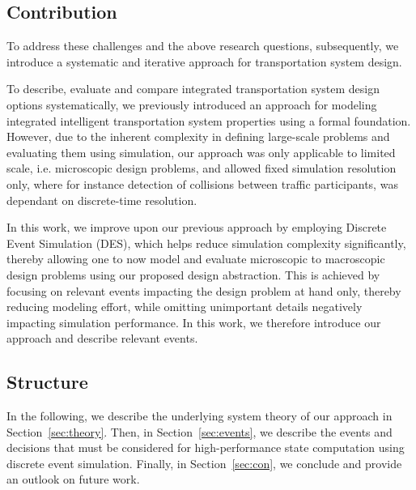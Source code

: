 \documentclass[graybox]{svmult}
\begin{document}
\subsection{Contribution}
To address these challenges and the above research questions, subsequently, we introduce a systematic and iterative approach for transportation system design.

To describe, evaluate and compare integrated transportation system design options systematically, we previously introduced an approach for modeling integrated intelligent transportation system properties using a formal foundation. However, due to the inherent complexity in defining large-scale problems and evaluating them using simulation, our approach was only applicable to limited scale, i.e. microscopic design problems, and allowed fixed simulation resolution only, where for instance detection of collisions between traffic participants, was dependant on discrete-time resolution.  

In this work, we improve upon our previous approach by employing Discrete Event Simulation (DES), which helps reduce simulation complexity significantly, thereby allowing one to now model and evaluate microscopic to macroscopic design problems using our proposed design abstraction. This is achieved by focusing on relevant events impacting the design problem at hand only, thereby reducing modeling effort, while omitting unimportant details negatively impacting simulation performance. In this work, we therefore introduce our approach and describe relevant events. 


\subsection{Structure}
In the following, we describe the underlying system theory of our approach in Section~\ref{sec:theory}.
Then, in Section~\ref{sec:events}, we describe the events and decisions that must be considered for high-performance state computation using discrete event simulation. 
Finally, in Section~\ref{sec:con}, we conclude and provide an outlook on future work.
\end{document}

